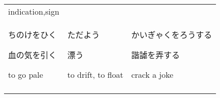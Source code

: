 \documentclass[12pt, a4j, landscape, dvipdfmx]{utarticle}
\begin{document}
\begin{minipage}[t][0pt]{\linewidth }
\begin{tabular}{||p{5.5cm}||p{5.5cm}||p{5.5cm}||}
{            indication,sign}\tabularnewline
            \hhline{|:=::=::=:|} \rule{0pt}{3ex}
            \hspace*{-.4cm} {\LARGE ちのけをひく}\newline
            \rule{0pt}{3ex} \hspace*{.4cm} {\small
            血の気を引く}\newline \rule{0pt}{3ex} \hspace*{.425cm}
            {\small to go pale}&\rule{0pt}{3ex}
            \hspace*{-.4cm} {\LARGE ただよう}\newline
            \rule{0pt}{3ex} \hspace*{.4cm} {\small
            漂う}\newline \rule{0pt}{3ex} \hspace*{.425cm}
            {\small to drift, to float}&\rule{0pt}{3ex}
            \hspace*{-.4cm} {\LARGE かいぎゃくをろうする}\newline
            \rule{0pt}{3ex} \hspace*{.4cm} {\small
            諧謔を弄する}\newline \rule{0pt}{3ex} \hspace*{.425cm}
            {\small crack a joke}\tabularnewline
            \hhline{|b:=:b:=:b:=:b|} 
        \end{tabular} 
    \end{minipage} 
\end{document}

